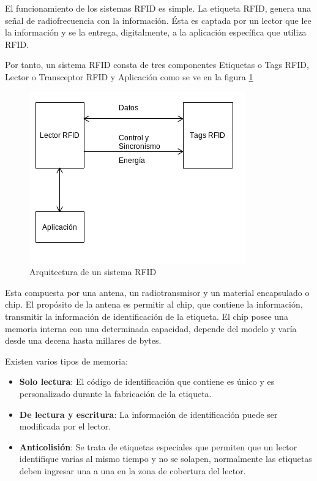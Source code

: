 El funcionamiento de los sistemas RFID es simple. La etiqueta RFID,  genera una señal de radiofrecuencia con la información. Ésta es captada por un lector que lee la información y se la entrega, digitalmente, a la aplicación específica que utiliza RFID.


Por tanto, un sistema RFID consta de tres componentes Etiquetas o Tags RFID, Lector o Transceptor RFID y Aplicación como  se ve en la figura \ref{arqui_RFID}  



\begin{figure}[H]
\centering
\includegraphics[scale=0.9]{images/capitulo2/arqui_RFID.png}
\caption{Arquitectura de un sistema RFID}
\label{arqui_RFID}
\end{figure}



Esta compuesta por una antena, un radiotransmisor y un material encapsulado o  chip. El propósito de la antena es permitir al chip, que contiene la información, transmitir la información de identificación de la etiqueta. El chip posee una memoria interna con una determinada capacidad, depende del modelo y varía desde una decena hasta millares de bytes.

 Existen varios tipos de memoria:

\begin{itemize}
	\item \textbf{Solo lectura}: El código de identificación que contiene es único y es personalizado durante la fabricación de la etiqueta.

	\item \textbf{De lectura y escritura}: La información de identificación puede ser modificada por el lector.

      	\item \textbf{Anticolisión}: Se trata de etiquetas especiales que permiten que un lector identifique varias al mismo tiempo y no se solapen, normalmente las etiquetas deben ingresar una a una en la zona de cobertura del lector.

\end{itemize}

